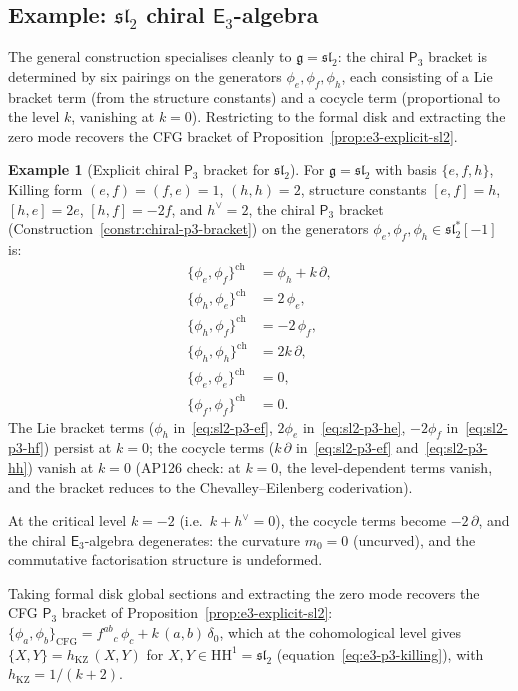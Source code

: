 \documentclass[11pt,reqno]{amsart}
\theoremstyle{definition}
\newtheorem{example}[theorem]{Example}
\theoremstyle{remark}
\newcommand{\HH}{\mathrm{HH}}
\newcommand{\Ethree}{\mathsf{E}_{3}}
\newcommand{\Pthree}{\mathsf{P}_{3}}
\newcommand{\fg}{\mathfrak{g}}
\numberwithin{equation}{section}
\begin{document}
\subsection{Example: $\mathfrak{sl}_2$ chiral $\Ethree$-algebra}
\label{subsec:sl2-chiral-e3}

The general construction specialises cleanly to
$\fg = \mathfrak{sl}_2$: the chiral $\Pthree$ bracket is
determined by six pairings on the generators
$\phi_e, \phi_f, \phi_h$, each consisting of a Lie bracket
term (from the structure constants) and a cocycle term
(proportional to the level $k$, vanishing at $k = 0$).
Restricting to the formal disk and extracting the zero mode
recovers the CFG bracket of
Proposition~\ref{prop:e3-explicit-sl2}.

\begin{example}[Explicit chiral $\Pthree$ bracket for
$\mathfrak{sl}_2$]
\label{ex:sl2-chiral-e3}
For $\fg = \mathfrak{sl}_2$ with basis $\{e, f, h\}$,
Killing form $(e,f) = (f,e) = 1$, $(h,h) = 2$,
structure constants $[e,f] = h$, $[h,e] = 2e$, $[h,f] = -2f$,
and $h^\vee = 2$, the chiral $\Pthree$ bracket
(Construction~\ref{constr:chiral-p3-bracket}) on the
generators $\phi_e, \phi_f, \phi_h \in \mathfrak{sl}_2^*[-1]$
is:
\begin{align}
  \label{eq:sl2-p3-ef}
  \{\phi_e, \phi_f\}^{\mathrm{ch}}
  &= \phi_h + k\,\partial, \\
  \label{eq:sl2-p3-he}
  \{\phi_h, \phi_e\}^{\mathrm{ch}}
  &= 2\,\phi_e, \\
  \label{eq:sl2-p3-hf}
  \{\phi_h, \phi_f\}^{\mathrm{ch}}
  &= -2\,\phi_f, \\
  \label{eq:sl2-p3-hh}
  \{\phi_h, \phi_h\}^{\mathrm{ch}}
  &= 2k\,\partial, \\
  \label{eq:sl2-p3-ee}
  \{\phi_e, \phi_e\}^{\mathrm{ch}}
  &= 0, \\
  \label{eq:sl2-p3-ff}
  \{\phi_f, \phi_f\}^{\mathrm{ch}}
  &= 0.
\end{align}
The Lie bracket terms ($\phi_h$ in~\eqref{eq:sl2-p3-ef},
$2\phi_e$ in~\eqref{eq:sl2-p3-he},
$-2\phi_f$ in~\eqref{eq:sl2-p3-hf}) persist at $k = 0$;
the cocycle terms ($k\,\partial$ in~\eqref{eq:sl2-p3-ef}
and~\eqref{eq:sl2-p3-hh}) vanish at $k = 0$
(AP126 check: at $k = 0$, the level-dependent terms
vanish, and the bracket reduces to the Chevalley--Eilenberg
coderivation).

At the critical level $k = -2$ (i.e.\ $k + h^\vee = 0$), the cocycle
terms become $-2\,\partial$, and the chiral
$\Ethree$-algebra degenerates: the curvature $m_0 = 0$
(uncurved), and the commutative factorisation structure is
undeformed.

Taking formal disk global sections and extracting the zero
mode recovers the CFG $\Pthree$ bracket of
Proposition~\ref{prop:e3-explicit-sl2}:
$\{\phi_a, \phi_b\}_{\mathrm{CFG}}
= f^{ab}{}_c\,\phi_c + k\,(a,b)\,\delta_0$, which at the
cohomological level gives
$\{X, Y\} = h_{\mathrm{KZ}}\,(X,Y)$ for
$X, Y \in \HH^1 = \mathfrak{sl}_2$
(equation~\eqref{eq:e3-p3-killing}), with
$h_{\mathrm{KZ}} = 1/(k+2)$.
\end{example}
\end{document}
